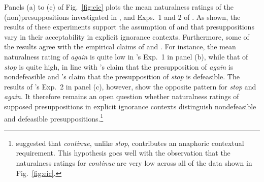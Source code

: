 \documentclass[11pt,fleqn]{article}
\newcommand{\6}{\mbox{$[\hspace*{-.6mm}[$}}
\newcommand{\9}{\mbox{$]\hspace*{-.6mm}]$}}
\newcommand{\citepos}[1]{\citeauthor{#1}'s \citeyear{#1}}
\begin{document}
Panels (a) to (c) of Fig.~\ref{fig:eic} plots the mean naturalness ratings of the (non)presuppositions investigated in \citealt[Exp.~3]{mandelkern-etal2020}, and Exps.~1 and 2 of \citealt{kalomoiros-schwarz2024}. As shown, the results of these experiments support the assumption of \citealt{simons01} and \citealt{abusch10} that presuppositions vary in their acceptability in explicit ignorance contexts. Furthermore, some of the results agree with the empirical claims of \citealt{simons01} and \citealt{abusch10}. For instance, the mean naturalness rating of \emph{again} is quite low in \citepos{kalomoiros-schwarz2024} Exp.~1 in panel (b), while that of \emph{stop} is quite high, in line with \citepos{abusch10} claim that the presupposition of \emph{again} is nondefeasible and \citepos{simons01} claim that the presupposition of \emph{stop} is defeasible. The results of \citepos{kalomoiros-schwarz2024} Exp.~2 in panel (c), however, show the opposite pattern for \emph{stop} and \emph{again}. It therefore remains an open question whether naturalness ratings of supposed presuppositions in explicit ignorance contexts distinguish nondefeasible and defeasible presuppositions.\footnote{\citealt[734ff.]{roberts-simons2024} suggested that \emph{continue}, unlike \emph{stop}, contributes an anaphoric contextual requirement. This hypothesis goes well with the observation that the naturalness ratings for \emph{continue} are very low across all of the data shown in Fig.~\ref{fig:eic}.}
\end{document}
